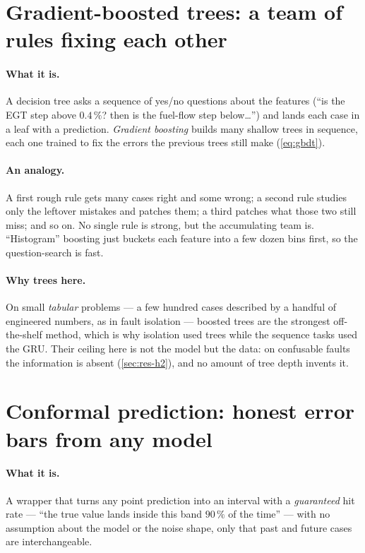 \section{Gradient-boosted trees: a team of rules fixing each other}
\label{sec:ml-gbdt}

\paragraph{What it is.} A decision tree asks a sequence of yes/no questions about the features
(``is the EGT step above $0.4\,\%$? then is the fuel-flow step below\ldots'') and lands each
case in a leaf with a prediction. \emph{Gradient boosting} builds many shallow trees in
sequence, each one trained to fix the errors the previous trees still make
(\cref{eq:gbdt}).

\paragraph{An analogy.} A first rough rule gets many cases right and some wrong; a second rule
studies only the leftover mistakes and patches them; a third patches what those two still miss;
and so on. No single rule is strong, but the accumulating team is. ``Histogram'' boosting just
buckets each feature into a few dozen bins first, so the question-search is fast.

\paragraph{Why trees here.} On small \emph{tabular} problems --- a few hundred cases described
by a handful of engineered numbers, as in fault isolation --- boosted trees are the strongest
off-the-shelf method, which is why isolation used trees while the sequence tasks used the GRU.
Their ceiling here is not the model but the data: on confusable faults the information is
absent (\cref{sec:res-h2}), and no amount of tree depth invents it.

\section{Conformal prediction: honest error bars from any model}
\label{sec:ml-conformal}

\paragraph{What it is.} A wrapper that turns any point prediction into an interval with a
\emph{guaranteed} hit rate --- ``the true value lands inside this band $90\,\%$ of the
time'' --- with no assumption about the model or the noise shape, only that past and future
cases are interchangeable.

